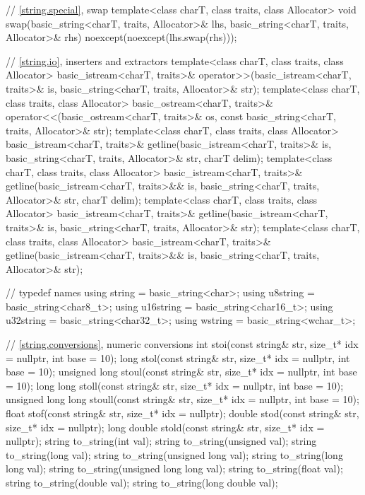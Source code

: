 \begin{codeblock}
{  // \ref{string.special}, swap
  template<class charT, class traits, class Allocator>
    void swap(basic_string<charT, traits, Allocator>& lhs,
              basic_string<charT, traits, Allocator>& rhs)
      noexcept(noexcept(lhs.swap(rhs)));

  // \ref{string.io}, inserters and extractors
  template<class charT, class traits, class Allocator>
    basic_istream<charT, traits>&
      operator>>(basic_istream<charT, traits>& is,
                 basic_string<charT, traits, Allocator>& str);
  template<class charT, class traits, class Allocator>
    basic_ostream<charT, traits>&
      operator<<(basic_ostream<charT, traits>& os,
                 const basic_string<charT, traits, Allocator>& str);
  template<class charT, class traits, class Allocator>
    basic_istream<charT, traits>&
      getline(basic_istream<charT, traits>& is,
              basic_string<charT, traits, Allocator>& str,
              charT delim);
  template<class charT, class traits, class Allocator>
    basic_istream<charT, traits>&
      getline(basic_istream<charT, traits>&& is,
              basic_string<charT, traits, Allocator>& str,
              charT delim);
  template<class charT, class traits, class Allocator>
    basic_istream<charT, traits>&
      getline(basic_istream<charT, traits>& is,
              basic_string<charT, traits, Allocator>& str);
  template<class charT, class traits, class Allocator>
    basic_istream<charT, traits>&
      getline(basic_istream<charT, traits>&& is,
              basic_string<charT, traits, Allocator>& str);

  //  typedef names
  using string    = basic_string<char>;
  using u8string  = basic_string<char8_t>;
  using u16string = basic_string<char16_t>;
  using u32string = basic_string<char32_t>;
  using wstring   = basic_string<wchar_t>;

  // \ref{string.conversions}, numeric conversions
  int stoi(const string& str, size_t* idx = nullptr, int base = 10);
  long stol(const string& str, size_t* idx = nullptr, int base = 10);
  unsigned long stoul(const string& str, size_t* idx = nullptr, int base = 10);
  long long stoll(const string& str, size_t* idx = nullptr, int base = 10);
  unsigned long long stoull(const string& str, size_t* idx = nullptr, int base = 10);
  float stof(const string& str, size_t* idx = nullptr);
  double stod(const string& str, size_t* idx = nullptr);
  long double stold(const string& str, size_t* idx = nullptr);
  string to_string(int val);
  string to_string(unsigned val);
  string to_string(long val);
  string to_string(unsigned long val);
  string to_string(long long val);
  string to_string(unsigned long long val);
  string to_string(float val);
  string to_string(double val);
  string to_string(long double val);

}
\end{codeblock}
